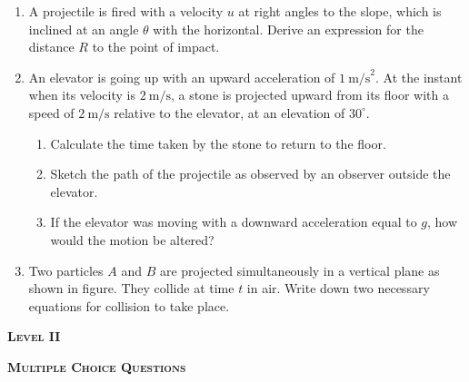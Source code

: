 \documentclass{article}
\begin{document}
\begin{enumerate}
    \item A projectile is fired with a velocity $u$ at right angles to the slope, which is inclined at an angle $\theta$ with the horizontal. Derive an expression for the distance $R$ to the point of impact.
    \begin{center}
    \end{center}
    \item An elevator is going up with an upward acceleration of $1~\text{m/s}^2$. At the instant when its velocity is $2~\text{m/s}$, a stone is projected upward from its floor with a speed of $2~\text{m/s}$ relative to
the elevator, at an elevation of $30^\circ$.
    \begin{enumerate}
        \item Calculate the time taken by the stone to return to the floor.
        \item Sketch the path of the projectile as observed by an observer outside the elevator.
        \item If the elevator was moving with a downward acceleration equal to $g$, how would the motion be altered?
    \end{enumerate}
    \item Two particles $A$ and $B$ are projected simultaneously in a vertical plane as shown in figure. They collide at time $t$ in air. Write down two necessary equations for collision to take place.
    \begin{center}
    \end{center}
\end{enumerate}

\begin{center}
    \textsc{\textbf{Level II}}
\end{center}


\begin{center}
    \textsc{\textbf{Multiple Choice Questions}}
\end{center}
\end{document}
